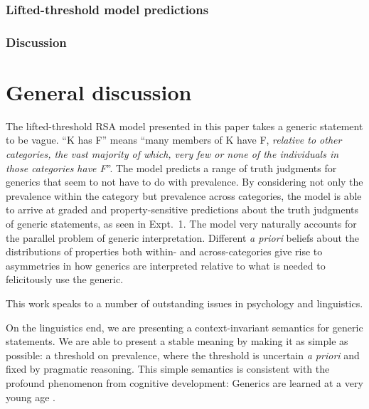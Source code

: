 \documentclass[10pt,letterpaper]{article}
\begin{document}

\subsubsection{Lifted-threshold model predictions}



\subsubsection{Discussion}



\section{General discussion}

The lifted-threshold RSA model presented in this paper takes a generic statement to be vague. ``K has F'' means ``many members of K have F, \emph{relative to other categories, the vast majority of which, very few or none of the individuals in those categories have F}''. 
The model predicts a range of truth judgments for generics that seem to not have to do with prevalence. 
By considering not only the prevalence within the category but prevalence across categories, the model is able to arrive at graded and property-sensitive predictions about the truth judgments of generic statements, as seen in Expt.~1. 
The model very naturally accounts for the parallel problem of generic interpretation. 
Different \emph{a priori} beliefs about the distributions of properties both within- and across-categories give rise to asymmetries in how generics are interpreted relative to what is needed to felicitously use the generic. 

This work speaks to a number of outstanding issues in psychology and linguistics. 

On the linguistics end, we are presenting a context-invariant semantics for generic statements. 
We are able to present a stable meaning by making it as simple as possible: a threshold on prevalence, where the threshold is uncertain \emph{a priori} and fixed by pragmatic reasoning.
This simple semantics is consistent with the profound phenomenon from cognitive development: Generics are learned at a very young age \cite{Gelman1998, Gelman2004, Gelman2008, Cimpian2008}.
\end{document}
